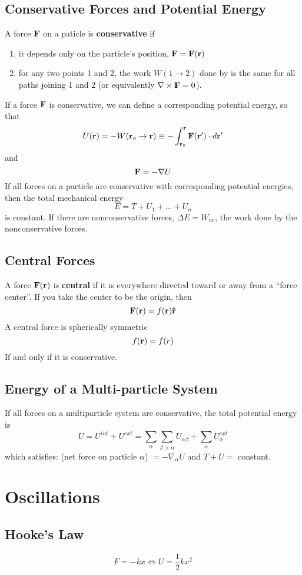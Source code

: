 \documentclass{article}
\newcommand{\uvec}[1]{\boldsymbol{\hat{\textbf{#1}}}}
\begin{document}
\subsection{Conservative Forces and Potential Energy}
A force $\vb{F}$ on a paticle is \textbf{conservative} if 
\begin{enumerate}
    \item it depends only on the particle's position, $\vb{F} = \vb{F(r)}$
    \item for any two points 1 and 2, the work $W(1\to2)$ done by  is the same for all paths joining 1 and 2 (or equivalently $\nabla \times \vb{F} = 0$).
\end{enumerate}
If a force $\vb{F}$ is conservative, we can define a corresponding potential energy, so that
$$
U(\vb{r}) = -W(\vb{r}_o \to \vb{r}) \equiv -\int_{\vb{r}_{0}}^{\vb{r}} \vb{F(r')} \cdot d\vb{r'}
$$
and
$$
\vb{F} = -\nabla U
$$
If all forces on a particle are conservative with corresponding potential energies, then the total mechanical energy
$$
E = T + U_1 + \dots + U_n
$$
is constant.  If there are nonconservative forces, $\Delta E = W_{nc}$, the work done by the nonconservative forces.
\subsection{Central Forces}
A force $\vb{F(r)}$ is \textbf{central} if it is everywhere directed toward or away from a ``force center''. If you take the center to be the origin, then
$$
\vb{F(r)} = f(\vb{r})\uvec{r}
$$
A central force is spherically symmetric 
$$
f(\vb{r}) = f(r)
$$
If and only if it is conservative.
\subsection{Energy of a Multi-particle System}
If all forces on a multiparticle system are conservative, the total potential energy is
$$
U = U^{int} + U^{ext} = \sum_\alpha \sum_{\beta > \alpha} U_{\alpha\beta} + \sum_{\alpha}U_{\alpha}^{ext}
$$
which satisfies: (net force on particle $\alpha$) $=-\nabla_{\alpha}U$ and $T + U = $ constant.

\section{Oscillations}
\subsection{Hooke's Law}
$$F = -kx \iff U = \frac{1}{2}kx^2$$
\end{document}
